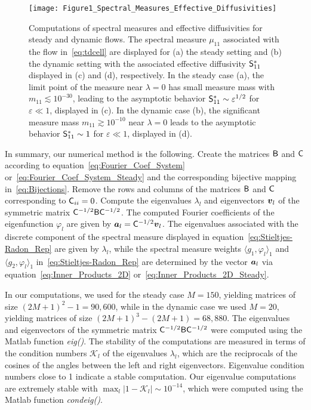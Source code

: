 \documentclass[amsa]{ipart}
\begin{document}
%
\begin{figure}[t]
  \centerline{\texttt{[image: Figure1\_Spectral\_Measures\_Effective\_Diffusivities]}} 
\caption{%
  Computations of spectral measures and effective diffusivities for
  steady and dynamic flows. The spectral measure $\mu_{11}$ associated
  with the flow in~\eqref{eq:tdcell} are displayed for (a) the steady
  setting and (b) the dynamic setting with the associated effective
  diffusivity $\mathsf{S}^*_{11}$ displayed in (c) and (d), respectively. In
  the steady case (a), the 
  limit point of the measure near $\lambda=0$ has small measure mass with
  $m_{11}\lesssim10^{-30}$, leading to the asymptotic behavior
  $\mathsf{S}^*_{11}\sim\varepsilon^{1/2}$ for $\varepsilon\ll1$, displayed in (c). In the dynamic case
  (b), the significant measure mass $m_{11}\gtrsim10^{-10}$
  near $\lambda=0$ leads to the asymptotic behavior
  $\mathsf{S}^*_{11}\sim1$ for $\varepsilon\ll1$, displayed in (d).
        }
\label{fig:Fig1_Spect_Meas_Eff_Diffus}
\end{figure}
%


In summary, our numerical method is the following. Create the matrices
$\mathsf{B}$ and $\mathsf{C}$ according to equation~\eqref{eq:Fourier_Coef_System}
or~\eqref{eq:Fourier_Coef_System_Steady} and the corresponding
bijective mapping in~\eqref{eq:Bijections}. Remove the rows
and columns of the matrices $\mathsf{B}$ and $\mathsf{C}$ corresponding to
$\mathsf{C}_{ii}=0$. Compute the eigenvalues $\lambda_l$ and eigenvectors $\boldsymbol{v}_l$ of
the symmetric matrix $\mathsf{C}^{-1/2}\mathsf{B}\mathsf{C}^{-1/2}$. The computed Fourier
coefficients of the eigenfunction $\varphi_l$ are given by
$\boldsymbol{a}_l=\mathsf{C}^{-1/2}\boldsymbol{v}_l$. The eigenvalues associated with the
discrete component of the spectral measure displayed in
equation~\eqref{eq:Stieltjes-Radon_Rep} are given by $\lambda_l$, while the
spectral measure weights $\langle g_1,\varphi_l\rangle_1$ and $\langle g_2,\varphi_l\rangle_1$
in~\eqref{eq:Stieltjes-Radon_Rep} are determined by the vector
$\boldsymbol{a}_l$ via equation~\eqref{eq:Inner_Products_2D}
or~\eqref{eq:Inner_Products_2D_Steady}.     



In our computations, we used for the steady case $M=150$, yielding
matrices of size $(2M+1)^2-1=90,600$, while in the dynamic case we used
$M=20$, yielding matrices of size $(2M+1)^3-(2M+1)=68,880$. The
eigenvalues and eigenvectors of the symmetric matrix
$\mathsf{C}^{-1/2}\mathsf{B}\mathsf{C}^{-1/2}$ were computed using the Matlab function
\emph{eig()}. The stability of the computations are measured in terms
of the condition numbers $\mathcal{K}_l$ of the eigenvalues $\lambda_l$,
which are the reciprocals of the cosines of the angles between the
left and right eigenvectors. Eigenvalue condition numbers close to 1
indicate a stable computation. Our eigenvalue computations are
extremely stable with $\max_l|1-\mathcal{K}_l|\sim10^{-14}$, which were
computed using the Matlab function \emph{condeig()}.
\end{document}
